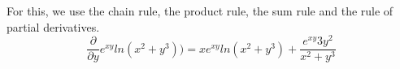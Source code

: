 For this, we use the chain rule, the product rule, the sum rule and the rule of partial derivatives.
$$
\frac{\partial}{\partial y}e^{xy}ln(x^2+y^3)) = xe^{xy}ln(x^2+y^3)+\frac{e^{xy}3y^2}{x^2+y^3}
$$